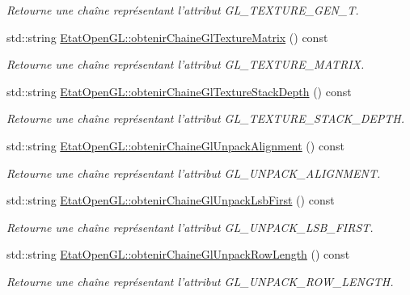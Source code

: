 \begin{DoxyCompactItemize}
\begin{DoxyCompactList}\small\item\em Retourne une chaîne représentant l'attribut G\-L\-\_\-\-T\-E\-X\-T\-U\-R\-E\-\_\-\-G\-E\-N\-\_\-\-T. \end{DoxyCompactList}\item 
std\-::string \hyperlink{group__utilitaire_gad21a2e048b745fe84c5befbd361f2f5e}{Etat\-Open\-G\-L\-::obtenir\-Chaine\-Gl\-Texture\-Matrix} () const 
\begin{DoxyCompactList}\small\item\em Retourne une chaîne représentant l'attribut G\-L\-\_\-\-T\-E\-X\-T\-U\-R\-E\-\_\-\-M\-A\-T\-R\-I\-X. \end{DoxyCompactList}\item 
std\-::string \hyperlink{group__utilitaire_ga278f05112b89edd0cbb3d601d73fadb4}{Etat\-Open\-G\-L\-::obtenir\-Chaine\-Gl\-Texture\-Stack\-Depth} () const 
\begin{DoxyCompactList}\small\item\em Retourne une chaîne représentant l'attribut G\-L\-\_\-\-T\-E\-X\-T\-U\-R\-E\-\_\-\-S\-T\-A\-C\-K\-\_\-\-D\-E\-P\-T\-H. \end{DoxyCompactList}\item 
std\-::string \hyperlink{group__utilitaire_gabcc3fe54f0a5f429af71e1bacef5a9c9}{Etat\-Open\-G\-L\-::obtenir\-Chaine\-Gl\-Unpack\-Alignment} () const 
\begin{DoxyCompactList}\small\item\em Retourne une chaîne représentant l'attribut G\-L\-\_\-\-U\-N\-P\-A\-C\-K\-\_\-\-A\-L\-I\-G\-N\-M\-E\-N\-T. \end{DoxyCompactList}\item 
std\-::string \hyperlink{group__utilitaire_ga5de4612f68058b5bc47576fc64f97004}{Etat\-Open\-G\-L\-::obtenir\-Chaine\-Gl\-Unpack\-Lsb\-First} () const 
\begin{DoxyCompactList}\small\item\em Retourne une chaîne représentant l'attribut G\-L\-\_\-\-U\-N\-P\-A\-C\-K\-\_\-\-L\-S\-B\-\_\-\-F\-I\-R\-S\-T. \end{DoxyCompactList}\item 
std\-::string \hyperlink{group__utilitaire_gaefbf6604571a413d33c117cb1c170a79}{Etat\-Open\-G\-L\-::obtenir\-Chaine\-Gl\-Unpack\-Row\-Length} () const 
\begin{DoxyCompactList}\small\item\em Retourne une chaîne représentant l'attribut G\-L\-\_\-\-U\-N\-P\-A\-C\-K\-\_\-\-R\-O\-W\-\_\-\-L\-E\-N\-G\-T\-H. \end{DoxyCompactList}\item 

\end{DoxyCompactItemize}

